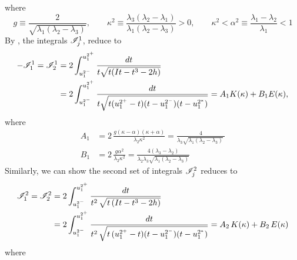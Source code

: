where
\[
g \equiv \frac{2}{\sqrt{\lambda_1 (\lambda_2-\lambda_3)}}, \qquad
\kappa^2 \equiv \frac{\lambda_3(\lambda_2 - \lambda_1)}{\lambda_1
(\lambda_2 - \lambda_3)} >0 ,\qquad \kappa^2 < \alpha^2 \equiv
\frac{\lambda_1 - \lambda_2}{\lambda_1} < 1
\]
By \citet[formula 256.12]{byrd54:_handb_of_ellip_integ_for}, the integrals
$\mathscr I_{j}^1$,
%
%
%
%
reduce to
\begin{align*}
-\mathscr I_1^1 = \mathscr I_2^1 &= 2\int_{u_1^{2^-}}^{u_1^{2^+}} \frac{dt}{t \sqrt{t (I t - t^3 - 2 h)}}\\
&= 2 \int_{u_1^{2^-}}^{u_1^{2^+}} \frac{dt}{t \sqrt{t (u_1^{2^+}-t)(t-u_1^{2^-})(t-u_1^{2^*})}} = A_1 K(\kappa) + B_1 E(\kappa),
\end{align*}
where
\[
\begin{aligned}
 A_1&=2\,{\frac {g\left(\kappa-\alpha\right)\left
    (\kappa+\alpha\right)}{ \lambda_2{\kappa}^2}}= {\frac
  {4}{\lambda_3 \sqrt {\lambda_1 \left(\lambda_2 - \lambda_3
    \right)}\;}}\\
 B_1 &=2\,{\frac {g{\alpha}^2}{\lambda_2{\kappa}^2}}=
 \frac{4(\lambda_3 - \lambda_2)}{\lambda_2 \lambda_3 \sqrt
  {\lambda_1\left( \lambda_2-\lambda_3\right)}}
\end{aligned}
\]
Similarly, we can show the second set of integrals $\mathscr I_{j}^2$
reduces to
\[
\begin{aligned}
 \mathscr I_1^2 = \mathscr I_2^2 &=
 2\int_{u_1^{{2}^{-}}}^{u_1^{{2}^{+}}}\frac{dt}{t^2\,\sqrt{ t \,(I t - t^3 - 2 h)}}\\
 &=2 \int_{u_1^{{2}^{-}}}^{u_1^{{2}^{+}}}\frac{dt}{t^2\,\sqrt{ t
   \, (u_1^{{2}^{+}}-t)(t-u_1^{{2}^{-}})(t-u_1^{{2}^{*}})}} =
 A_2\, K(\kappa) + B_2\, E(\kappa)
\end{aligned}
\]
where
